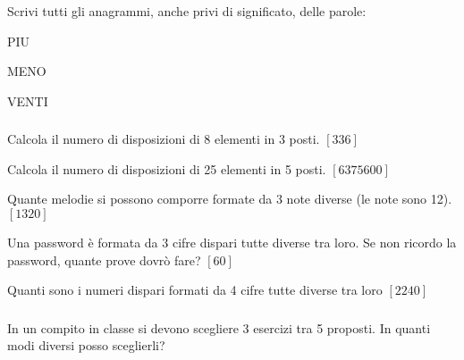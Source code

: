 \begin{esercizio}\label{P.3}
Scrivi tutti gli anagrammi, anche privi di significato, delle parole:
\begin{multicols}{3}
 \begin{enumeratea}
  \item PIU
  \item MENO
  \item VENTI
 \end{enumeratea}
 \end{multicols}
\end{esercizio}

\subsubsection*{}

\begin{esercizio}\label{D.1}
Calcola il numero di disposizioni di 8 elementi in 3 posti.
\hfill \(\left[336\right]\)
\end{esercizio}

\begin{esercizio}\label{D.2}
Calcola il numero di disposizioni di 25 elementi in 5 posti.
\hfill \(\left[6375600\right]\)
\end{esercizio}

\begin{esercizio}\label{D.3}
Quante melodie si possono comporre formate da 3 note diverse (le note sono 12).
\hfill \(\left[1320\right]\)
\end{esercizio}

\begin{esercizio}\label{D.4}
Una password è formata da 3 cifre dispari tutte diverse tra loro. Se non ricordo la password, quante prove dovrò fare?
\hfill \(\left[60\right]\)
\end{esercizio}

\begin{esercizio}\label{D.5}
Quanti sono i numeri dispari formati da 4 cifre tutte diverse tra loro
\hfill \(\left[2240\right]\)
\end{esercizio}

\subsubsection*{}

\begin{esercizio}
\label{ese:C.1}
In un compito in classe si devono scegliere 3 esercizi tra 5 proposti. In quanti modi diversi posso sceglierli?
\end{esercizio}

